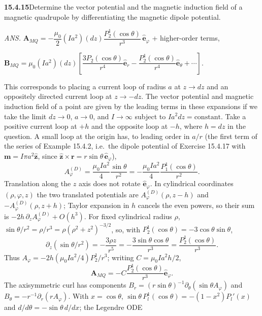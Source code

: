\par\bigskip
\noindent\textbf{15.4.15}\quad Determine the vector potential and the
magnetic induction field of a magnetic quadrupole by differentiating
the magnetic dipole potential.
\par\nobreak\hfill\emph{ANS.}\enspace
$\mathbf{A}_{MQ}=-\dfrac{\mu_{0}}{2}(Ia^{2})(dz)
\dfrac{P_{2}^{1}(\cos\theta)}{r^{3}}\,\hat{\mathbf{e}}_{\varphi}$
+ higher-order terms,\par\nobreak\hfill
$\mathbf{B}_{MQ}=\mu_{0}(Ia^{2})(dz)\left[
\dfrac{3P_{2}(\cos\theta)}{r^{4}}\hat{\mathbf{e}}_{r}
-\dfrac{P_{2}^{1}(\cos\theta)}{r^{4}}\hat{\mathbf{e}}_{\theta}
+\cdots\right]$.
\par This corresponds to placing a current loop of radius $a$ at
$z\to dz$ and an oppositely directed current loop at $z\to -dz$. The
vector potential and magnetic induction field of a point  are
given by the leading terms in these expansions if we take the limit
$dz\to0$, $a\to0$, and $I\to\infty$ subject to $Ia^{2}dz=\mathrm{constant}$.
\solution
Take a positive current loop at $+h$ and the opposite loop at $-h$,
where $h=dz$ in the question. A small loop at the origin has, to
leading order in $a/r$ (the first term of the series of
Example 15.4.2, i.e.\ the dipole potential of Exercise 15.4.17 with
$\mathbf m=I\pi a^2\hat{\mathbf z}$, since
$\hat{\mathbf z}\times\mathbf r=r\sin\theta\,\hat{\mathbf e}_\varphi$),
\[
A_\varphi^{(D)}=\frac{\mu_0Ia^2}{4}\frac{\sin\theta}{r^2}
=-\frac{\mu_0Ia^2}{4}\frac{P_1^1(\cos\theta)}{r^2}.
\]
Translation along the $z$ axis does not rotate $\hat{\mathbf e}_\varphi$.
In cylindrical coordinates $(\rho,\varphi,z)$ the two translated
potentials are $A_\varphi^{(D)}(\rho,z-h)$ and
$-A_\varphi^{(D)}(\rho,z+h)$; Taylor expansion in $h$ cancels the even
powers, so their sum is
$-2h\,\partial_zA_\varphi^{(D)}+O(h^3)$.
For fixed cylindrical radius $\rho$,
$\sin\theta/r^2=\rho/r^3=\rho(\rho^2+z^2)^{-3/2}$, so, with
$P_2^1(\cos\theta)=-3\cos\theta\sin\theta$,
\[
\partial_z(\sin\theta/r^2)=-\frac{3\rho z}{r^5}
=-\frac{3\sin\theta\cos\theta}{r^3}
=\frac{P_2^1(\cos\theta)}{r^3}.
\]
Thus $A_\varphi=-2h(\mu_0Ia^2/4)P_2^1/r^3$; writing $C=\mu_0Ia^2h/2$,
\[
\boxed{\mathbf A_{MQ}=-C\frac{P_2^1(\cos\theta)}{r^3}
\hat{\mathbf e}_\varphi}.
\]
The axisymmetric curl has components
$B_r=(r\sin\theta)^{-1}\partial_\theta(\sin\theta A_\varphi)$ and
$B_\theta=-r^{-1}\partial_r(rA_\varphi)$.
With $x=\cos\theta$, $\sin\theta\,P_l^1(\cos\theta)=-(1-x^2)P_l'(x)$
and $d/d\theta=-\sin\theta\,d/dx$; the Legendre ODE
